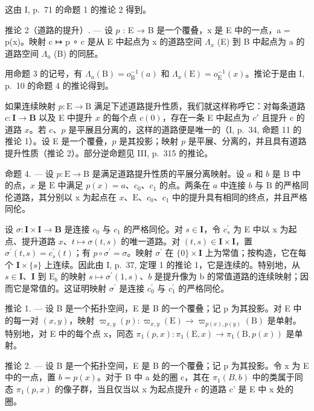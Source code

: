 这由 I, p.~71 的命题 1 的推论 2 得到。

推论 2（道路的提升）. --- 设 \(p\) : E → B 是一个覆叠，x 是 E 中的一点，a = p(x)。映射 c ↦ p ∘ c 是从 E 中起点为 x 的道路空间 \(\Lambda_x\) (E) 到 B 中起点为 a 的道路空间 \(\Lambda_a\) (B) 的同胚。

用命题 3 的记号，有 \(\Lambda_{a}(\mathrm{B}) = o_{\mathrm{B}}^{-1}(a)\) 和 \(\Lambda_x(\mathrm{E}) = o_{\mathrm{E}}^{-1}(x)\)。推论于是由 I, p.~10 的命题 4 的推论得到。

如果连续映射 \(p \colon \mathrm{E} \to \mathrm{B}\) 满足下述道路提升性质，我们就这样称呼它：对每条道路 \(c \colon \mathbf{I} \to \mathbf{B}\) 以及 E 中提升 \(x\) 的每个点 \(c(0)\)，存在一条 E 中起点为 \(c'\) 且提升 c 的道路 \(x\)。若 \(c\)、\(p\) 是平展且分离的，这样的道路便是唯一的（I, p.~34, 命题 11 的推论 1）。设 E 是一个覆叠，\(p\) 是其投影；映射 \(p\) 是平展、分离的，并且具有道路提升性质（推论 2）。部分逆命题见 III, p.~315 的推论。

命题 4. --- 设 \(p \colon \mathrm{E} \to \mathrm{B}\) 是满足道路提升性质的平展分离映射。设 \(a\) 和 \(b\) 是 \(\mathrm{B}\) 中的点，\(x\) 是 \(\mathrm{E}\) 中满足 \(p(x) = a\)、\(c_0\)、\(c_1\) 的点。两条在 \(a\) 中连接 \(b\) 与 \(\mathrm{B}\) 的严格同伦道路，其分别以 x 为起点在 \(x\)、\(\mathrm{E}\)、\(c_0\)、\(c_1\) 中的提升具有相同的终点，并且严格同伦。

设 \(\sigma\colon\mathbf{I}\times\mathbf{I}\to\mathbf{B}\) 是连接 \(c_{0}\) 与 \(c_{1}\) 的严格同伦。对 \(s\in\mathbf{I}\)，令 \(c_{s}^{\prime}\) 为 E 中以 x 为起点、提升道路 \(x\)、\(t\mapsto\sigma(t,s)\) 的唯一道路。对 \((t,s)\in\mathbf{I}\times\mathbf{I}\)，置 \(\sigma^{\prime}(t,s)=c_{s}^{\prime}(t)\)；有 \(p\circ\sigma^{\prime}=\sigma\)。映射 \(\sigma^{\prime}\) 在 \(\{0\}\times\mathbf{I}\) 上为常值；按构造，它在每个 \(\mathbf{I}\times\{s\}\) 上连续。因此由 I, p.~37, 定理 1 的推论 1，它是连续的。特别地，从 \(s\in\mathbf{I}\)、\(\mathbf{I}\) 到 \(\mathrm{E}_{b}\) 的映射 \(s\mapsto\sigma^{\prime}(1,s)\)、\(b\) 是提升像为 b 的常值道路的连续映射；因而它是常值的。这证明映射 \(\sigma^{\prime}\) 是连接 \(c_{0}^{\prime}\) 与 \(c_{1}^{\prime}\) 的严格同伦。

推论 1. --- 设 B 是一个拓扑空间，E 是 B 的一个覆叠；记 p 为其投影。对 E 中的每一对 \((x,y)\)，映射 \(\varpi_{x,y}(p)\colon\varpi_{x,y}(\mathrm{E})\to\varpi_{p(x),p(y)}(\mathrm{B})\) 是单射。特别地，对 E 中的每个点 x，同态 \(\pi_{1}(p,x)\colon\pi_{1}(\mathrm{E},x)\to\pi_{1}(\mathrm{B},p(x))\) 是单射。

推论 2. --- 设 B 是一个拓扑空间，E 是 B 的一个覆叠；记 p 为其投影。令 x 为 E 中的一点，置 \(b = p(x)\)。对于 B 中 a 处的圈 c，其在 \(\pi_{1}(B, b)\) 中的类属于同态 \(\pi_{1}(p, x)\) 的像子群，当且仅当以 x 为起点提升 c 的道路 c' 是 E 中 x 处的圈。

